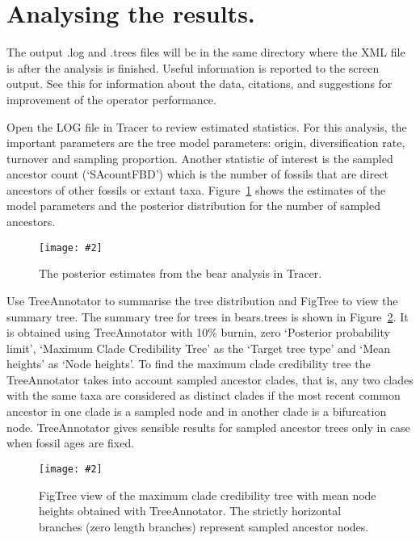 \documentclass[12pt]{article}
\newcommand{\includeimage}[2][]{%
\texttt{[image: \#2]}
}
\begin{document}
\section{Analysing the results.} 

The output .log and .trees files will be in the same directory where the XML file is after the analysis is finished. Useful information is reported to the screen output. See this for information about the data, citations, and suggestions for improvement of the operator performance.  

Open the LOG file in Tracer to review estimated statistics. For this analysis, the important parameters are the tree model parameters: origin, diversification rate, turnover and sampling proportion. Another statistic of interest is the sampled ancestor count (`SAcountFBD') which is the number of fossils that are direct ancestors of other fossils or extant taxa. Figure~\ref{fig:TracerOutput} shows the estimates of the model parameters and the posterior distribution for the number of sampled ancestors. 

\begin{figure}	
\centering
\includeimage[width=\textwidth]{figures/TracerOutput}
\caption{The posterior estimates from the bear analysis in Tracer. \label{fig:TracerOutput}}
\end{figure}

Use TreeAnnotator to summarise the tree distribution and FigTree to view the summary tree. The summary tree for trees in bears.trees is shown in Figure~\ref{fig:FigTree}. It is obtained using TreeAnnotator with 10\% burnin, zero `Posterior probability limit', `Maximum Clade Credibility Tree' as the `Target tree type' and `Mean heights' as `Node heights'. To find the maximum clade credibility tree the TreeAnnotator takes into account sampled ancestor clades, that is, any two clades with the same taxa are considered as distinct clades if the most recent common ancestor in one clade is a sampled node and in another clade is a bifurcation node. TreeAnnotator gives sensible results for sampled ancestor trees only in case when fossil ages are fixed.  

\begin{figure}	
\centering
\includeimage[width=\textwidth]{figures/FigTree}
\caption{FigTree view of the maximum clade credibility tree with mean node heights obtained with TreeAnnotator. The strictly horizontal branches (zero length branches) represent sampled ancestor nodes. \label{fig:FigTree}}
\end{figure}



\end{document}

